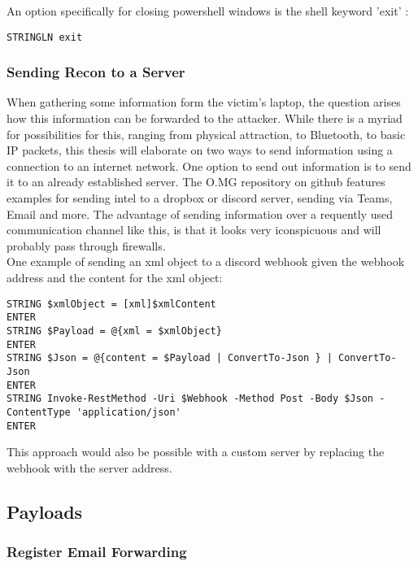 An option specifically for closing powershell windows is the shell keyword 'exit' :
\begin{lstlisting}
STRINGLN exit
\end{lstlisting}


\subsubsection{Sending Recon to a Server}

When gathering some information form the victim's laptop, the question arises how this information can be forwarded to the attacker. While there is a myriad for possibilities for this, ranging from physical attraction, to Bluetooth, to basic IP packets, this thesis will elaborate on two ways to send information using a connection to an internet network.
One option to send out information is to send it to an already established server. The O.MG repository on github features examples for sending intel to a dropbox or discord server, sending via Teams, Email and more. The advantage of sending information over a requently used communication channel like this, is that it looks very iconspicuous and will probably pass through firewalls.\\
One example of sending an xml object to a discord webhook given the webhook address and the content for the xml object:
\begin{lstlisting}
STRING $xmlObject = [xml]$xmlContent
ENTER
STRING $Payload = @{xml = $xmlObject}
ENTER
STRING $Json = @{content = $Payload | ConvertTo-Json } | ConvertTo-Json	
ENTER
STRING Invoke-RestMethod -Uri $Webhook -Method Post -Body $Json -ContentType 'application/json'
ENTER
\end{lstlisting}

This approach would also be possible with a custom server by replacing the webhook with the server address.



\subsection{Payloads}

\subsubsection{Register Email Forwarding}

